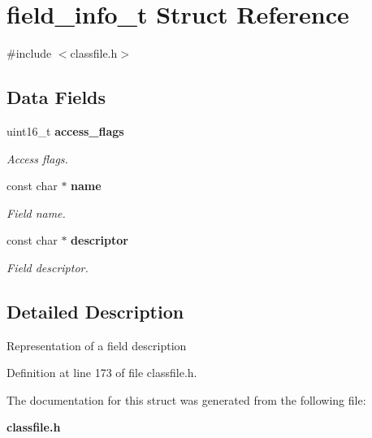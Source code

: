 \section{field\_\-info\_\-t Struct Reference}
\label{structfield__info__t}


{\ttfamily \#include $<$classfile.h$>$}

\subsection*{Data Fields}
\begin{DoxyCompactItemize}
\item 
uint16\_\-t {\bf access\_\-flags}\label{structfield__info__t_a2c7f37c55a4b344a1754e9a3e70b7c6a}

\begin{DoxyCompactList}\small\item\em Access flags. \item\end{DoxyCompactList}\item 
const char $\ast$ {\bf name}\label{structfield__info__t_a71fcd6f4559d5e3d5dde4e0387ec5454}

\begin{DoxyCompactList}\small\item\em Field name. \item\end{DoxyCompactList}\item 
const char $\ast$ {\bf descriptor}\label{structfield__info__t_ae7b47d9a71c3fc4a7b1044bbbc8c43eb}

\begin{DoxyCompactList}\small\item\em Field descriptor. \item\end{DoxyCompactList}\end{DoxyCompactItemize}


\subsection{Detailed Description}
Representation of a field description 

Definition at line 173 of file classfile.h.



The documentation for this struct was generated from the following file:\begin{DoxyCompactItemize}
\item 
{\bf classfile.h}\end{DoxyCompactItemize}
